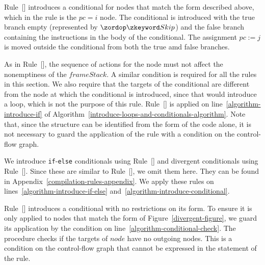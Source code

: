 Rule~[] introduces a conditional for
nodes that match the form described above, which in the rule is the
$pc = i$ node.
The conditional is introduced with the true branch empty (represented
by $\Skip$) and the false branch containing the instructions in the
body of the conditional.
The assignment $pc := j$ is moved outside the conditional from both
the true amd false branches.

As in Rule~[], the sequence of
actions for the node must not affect the nonemptiness of the
$frameStack$.
A similar condition is required for all the rules in this section.
We also require that the targets of the conditional are different from
the node at which the conditional is introduced, since that would
introduce a loop, which is not the purpose of this rule.
Rule~[] is applied on
line~\ref{algorithm-introduce-if} of
Algorithm~\ref{introduce-loops-and-conditionals-algorithm}.
Note that, since the structure can be identified from the form of the
\Circus{} code alone, it is not necessary to guard the application of
the rule with a condition on the control-flow graph.

We introduce \texttt{if}-\texttt{else} conditionals using
Rule~[] and divergent conditionals
using Rule~[].
Since these are similar to Rule~[], we
omit them here.
They can be found in Appendix~\ref{compilation-rules-appendix}.
We apply these rules on lines~\ref{algorithm-introduce-if-else}
and~\ref{algorithm-introduce-conditional}.

Rule~[] introduces a
conditional with no restrictions on its form.
To ensure it is only applied to nodes that match the form of
Figure~\ref{divergent-figure}, we guard its application by the
condition  on
line~\ref{algorithm-conditional-check}.
The procedure  checks if the targets
of $node$ have no outgoing nodes.
This is a condition on the control-flow graph that cannot be expressed
in the statement of the rule.

